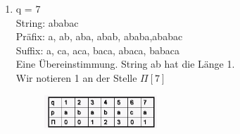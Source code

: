 \documentclass[a4paper,10pt]{report}
\begin{document}
\begin{enumerate}
\begin{figure}[H]
\end{figure}
\item
q = 7\\
String: ababac\\
Präfix: a, ab, aba, abab, ababa,ababac \\
Suffix: a, ca, aca, baca, abaca, babaca\\
Eine Übereinstimmung. String ab hat die Länge 1.\\
Wir notieren 1 an der Stelle $\Pi[7]$
\begin{figure}[H]
	\begin{center}
  		\includegraphics[width=0.4\textwidth]{img/kmp7.png}
	\end{center}
\end{figure}
\end{enumerate}
\newpage
\end{document}

